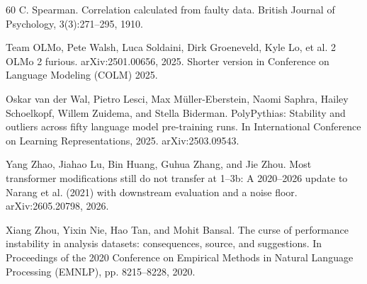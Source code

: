 \begin{thebibliography}{60}
C. Spearman. Correlation calculated from faulty data. British Journal of Psychology, 3(3):271--295, 1910.

Team OLMo, Pete Walsh, Luca Soldaini, Dirk Groeneveld, Kyle Lo, et al. 2 OLMo 2 furious. arXiv:2501.00656, 2025. Shorter version in Conference on Language Modeling (COLM) 2025.

Oskar van der Wal, Pietro Lesci, Max M\"{u}ller-Eberstein, Naomi Saphra, Hailey Schoelkopf, Willem Zuidema, and Stella Biderman. PolyPythias: Stability and outliers across fifty language model pre-training runs. In International Conference on Learning Representations, 2025. arXiv:2503.09543.

Yang Zhao, Jiahao Lu, Bin Huang, Guhua Zhang, and Jie Zhou. Most transformer modifications still do not transfer at 1--3b: A 2020--2026 update to Narang et al. (2021) with downstream evaluation and a noise floor. arXiv:2605.20798, 2026.

Xiang Zhou, Yixin Nie, Hao Tan, and Mohit Bansal. The curse of performance instability in analysis datasets: consequences, source, and suggestions. In Proceedings of the 2020 Conference on Empirical Methods in Natural Language Processing (EMNLP), pp. 8215--8228, 2020.

\end{thebibliography}
